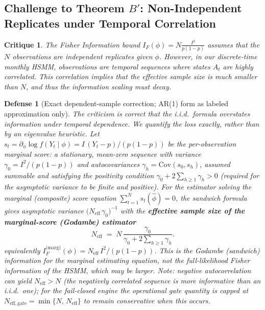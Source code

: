\documentclass[11pt,a4paper]{article}
\newtheorem{critique}{Critique}
\newtheorem{defense}{Defense}
\begin{document}
\subsection{Challenge to Theorem $B'$: Non-Independent Replicates under Temporal Correlation}
\begin{critique}
The Fisher Information bound $I_F(\phi) = N \frac{I^2}{p(1-p)}$ assumes that the $N$ observations are independent replicates given $\phi$. However, in our discrete-time monthly HSMM, observations are temporal sequences where states $A_t$ are highly correlated. This correlation implies that the effective sample size is much smaller than $N$, and thus the information scaling must decay.
\end{critique}

\begin{defense}[Exact dependent-sample correction; AR(1) form as labeled approximation only]
The criticism is correct that the i.i.d.\ formula overstates information under temporal dependence. We quantify the loss exactly, rather than by an eigenvalue heuristic. Let $s_t = \partial_\phi \log f(Y_t \mid \phi) = I\,(Y_t - p)/(p(1-p))$ be the per-observation marginal score: a stationary, mean-zero sequence with variance $\gamma_0 = I^2/(p(1-p))$ and autocovariances $\gamma_h = \mathrm{Cov}(s_0, s_h)$, assumed summable and satisfying the positivity condition $\gamma_0 + 2\sum_{h \ge 1} \gamma_h > 0$ (required for the asymptotic variance to be finite and positive). For the estimator solving the marginal (composite) score equation $\sum_{t=1}^N s_t(\hat\phi) = 0$, the sandwich formula gives asymptotic variance $\big(N_{\mathrm{eff}}\,\gamma_0\big)^{-1}$ with the \textbf{effective sample size of the marginal-score (Godambe) estimator} %
\begin{equation}\label{eq:neff_exact}
N_{\mathrm{eff}} \;=\; N\, \frac{\gamma_0}{\gamma_0 + 2 \sum_{h \ge 1} \gamma_h}. %
\end{equation}
equivalently $I_F^{\text{(marg)}}(\phi) = N_{\mathrm{eff}}\, I^2 / (p(1-p))$. This is the Godambe (sandwich) information for the marginal estimating equation, not the full-likelihood Fisher information of the HSMM, which may be larger. Note: negative autocorrelation can yield $N_{\mathrm{eff}} > N$ (the negatively correlated sequence is more informative than an i.i.d.\ one); for the fail-closed engine the operational gate quantity is capped at $N_{\mathrm{eff,gate}} = \min\{N,\, N_{\mathrm{eff}}\}$ to remain conservative when this occurs. %

\end{defense}
\end{document}
